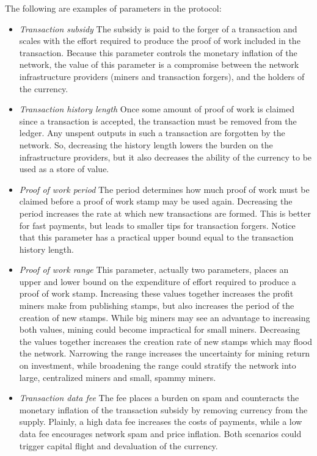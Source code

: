 \documentclass[10pt,twocolumn]{article}
\begin{document}
The following are examples of parameters in the protocol:

\begin{itemize}
\item {\em Transaction subsidy}  The subsidy is paid to the forger of a transaction and scales with the effort required to produce the proof of work included in the transaction.  Because this parameter controls the monetary inflation of the network, the value of this parameter is a compromise between the network infrastructure providers (miners and transaction forgers), and the holders of the currency.

\item {\em Transaction history length}  Once some amount of proof of work is claimed since a transaction is accepted, the transaction must be removed from the ledger.  Any unspent outputs in such a transaction are forgotten by the network.  So, decreasing the history length lowers the burden on the infrastructure providers, but it also decreases the ability of the currency to be used as a store of value.

\item {\em Proof of work period}  The period determines how much proof of work must be claimed before a proof of work stamp may be used again.  Decreasing the period increases the rate at which new transactions are formed.  This is better for fast payments, but leads to smaller tips for transaction forgers.  Notice that this parameter has a practical upper bound equal to the transaction history length.

\item {\em Proof of work range}  This parameter, actually two parameters, places an upper and lower bound on the expenditure of effort required to produce a proof of work stamp.  Increasing these values together increases the profit miners make from publishing stamps, but also increases the period of the creation of new stamps.  While big miners may see an advantage to increasing both values, mining could become impractical for small miners.  Decreasing the values together increases the creation rate of new stamps which may flood the network.  Narrowing the range increases the uncertainty for mining return on investment, while broadening the range could stratify the network into large, centralized miners and small, spammy miners.

\item {\em Transaction data fee}  The fee places a burden on spam and counteracts the monetary inflation of the transaction subsidy by removing currency from the supply.  Plainly, a high data fee increases the costs of payments, while a low data fee encourages network spam and price inflation.  Both scenarios could trigger capital flight and devaluation of the currency.
\end{itemize}
\end{document}
